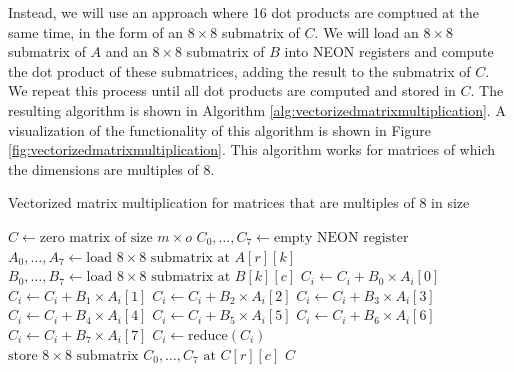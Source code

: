 \documentclass[11pt,a4paper]{report}
\theoremstyle{definition}
\begin{document}
Instead, we will use an approach where 16 dot products are comptued at the same time, in the form of an $8\times8$ submatrix of $C$. We will load an $8\times8$ submatrix of $A$ and an $8\times8$ submatrix of $B$ into NEON registers and compute the dot product of these submatrices, adding the result to the submatrix of $C$. We repeat this process until all dot products are computed and stored in $C$. The resulting algorithm is shown in Algorithm \ref{alg:vectorizedmatrixmultiplication}. A visualization of the functionality of this algorithm is shown in Figure \ref{fig:vectorizedmatrixmultiplication}. This algorithm works for matrices of which the dimensions are multiples of 8.

\begin{algorithm}
  \caption{Vectorized matrix multiplication for matrices that are multiples of 8 in size}
  \label{alg:vectorizedmatrixmultiplication}
  \begin{algorithmic}
      \State $C \gets \text{zero matrix of size } m \times o$
          \State $C_0, \dots, C_7 \gets \text{empty NEON register}$
            \State $A_0, \dots, A_7 \gets \text{load } 8\times8 \text{ submatrix at } A[r][k]$
            \State $B_0, \dots, B_7 \gets \text{load } 8\times8 \text{ submatrix at } B[k][c]$
              \State $C_i \gets C_i + B_0 \times A_i[0]$
              \State $C_i \gets C_i + B_1 \times A_i[1]$
              \State $C_i \gets C_i + B_2 \times A_i[2]$
              \State $C_i \gets C_i + B_3 \times A_i[3]$
              \State $C_i \gets C_i + B_4 \times A_i[4]$
              \State $C_i \gets C_i + B_5 \times A_i[5]$
              \State $C_i \gets C_i + B_6 \times A_i[6]$
              \State $C_i \gets C_i + B_7 \times A_i[7]$
            \EndFor
          \EndFor
            \State $C_i \gets \text{reduce}(C_i)$
          \EndFor
          \State $\text{store } 8\times8 \text{ submatrix } C_0, \dots, C_7 \text{ at } C[r][c]$
        \EndFor
      \EndFor
      \State \Return $C$
    \EndFunction
  \end{algorithmic}
\end{algorithm}
\end{document}
